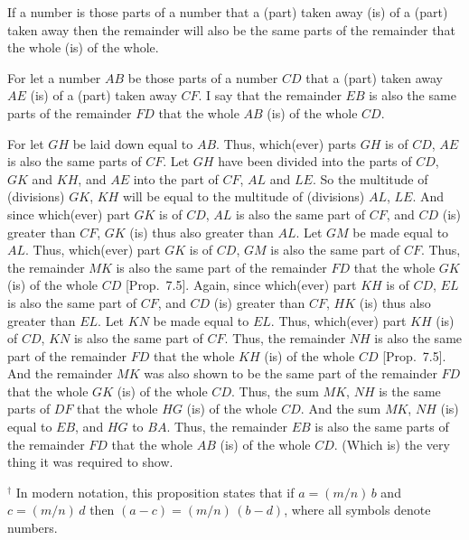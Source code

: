 \begin{Parallel}{}{}
{If  a number is those parts of a number that a
(part) taken away (is) of a (part) taken away then the remainder will also be
the same parts of the remainder that the whole (is) of the whole.

\epsfysize=1.4in
\centerline{}

For let a number $AB$ be those parts of a number $CD$ that a
(part) taken away $AE$ (is) of a (part) taken away $CF$. I say that the remainder
$EB$ is also the same parts of the remainder $FD$ that the whole $AB$ (is) of the
whole $CD$.

For let $GH$ be laid down equal to $AB$. Thus, which(ever) parts $GH$ is of $CD$,
$AE$ is also the same parts of $CF$. Let $GH$ have been divided into the parts
of $CD$, $GK$ and $KH$, and $AE$ into the part of $CF$, $AL$ and $LE$. So the
multitude of (divisions) $GK$, $KH$ will be equal to the multitude of (divisions)
$AL$, $LE$. And since which(ever) part $GK$ is of $CD$, $AL$ is also the same part 
of $CF$, and $CD$ (is) greater than $CF$,  $GK$ (is) thus also greater than $AL$.
Let $GM$ be made equal to $AL$. Thus, which(ever) part $GK$ is of $CD$, $GM$ is also the same part of $CF$. Thus, the remainder $MK$ is also the same part of the
remainder $FD$ that  the whole $GK$ (is) of the whole $CD$ [Prop.~7.5]. Again, since
which(ever) part $KH$ is of $CD$, $EL$ is also the same part of $CF$, and
$CD$ (is) greater than $CF$, $HK$ (is) thus also greater than $EL$. Let $KN$ be
made equal to $EL$. Thus, which(ever) part $KH$ (is) of $CD$, $KN$ is also the
same part of $CF$. Thus, the remainder $NH$ is also the same part 
of the remainder $FD$ that the whole $KH$ (is) of the whole $CD$  [Prop.~7.5]. And the remainder $MK$
was also shown to be the same part of the remainder $FD$ that the whole
$GK$ (is) of the whole $CD$. Thus, the sum $MK$, $NH$ is the same parts of
$DF$ that the whole $HG$ (is) of the whole $CD$. And the sum $MK$, $NH$
(is) equal to $EB$, and $HG$ to $BA$. Thus, the remainder $EB$ is also
the same parts of the remainder $FD$ that the whole $AB$ (is)
of the whole $CD$. (Which is) the very thing it was required to show.}
\end{Parallel}
{\footnotesize\noindent$^\dag$ In modern notation, this
proposition states that if $a=(m/n)\,b$ and $c=(m/n)\,d$ then $(a-c)=
(m/n)\,(b-d)$, where all symbols denote numbers.}

